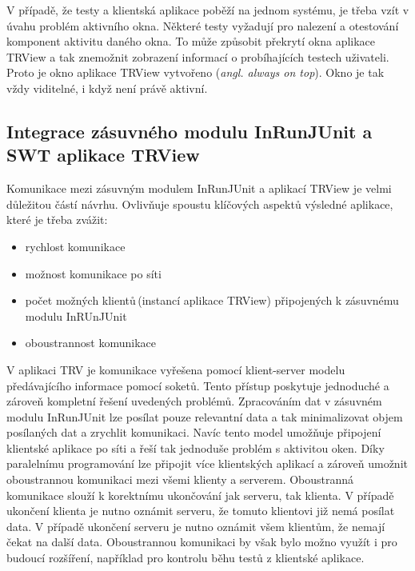     \noindent
    V případě, že testy a klientská aplikace poběží na jednom systému, je třeba vzít v úvahu problém aktivního okna. Některé testy vyžadují pro nalezení a otestování komponent aktivitu daného okna. To může způsobit překrytí okna aplikace TRView a tak znemožnit zobrazení informací o probíhajících testech uživateli. Proto je okno aplikace TRView vytvořeno (\emph{angl. always on top}). Okno je tak vždy viditelné, i když není právě aktivní.

    \subsection{Integrace zásuvného modulu InRunJUnit a SWT aplikace TRView}
    Komunikace mezi zásuvným modulem InRunJUnit a aplikací TRView je velmi důležitou částí návrhu. Ovlivňuje spoustu klíčových aspektů výsledné aplikace, které je třeba zvážit:
    \begin{itemize}
     \item rychlost komunikace
     \item možnost komunikace po síti
     \item počet možných klientů\,(instancí aplikace TRView) připojených k zásuvnému modulu InRUnJUnit
     \item oboustrannost komunikace
    \end{itemize}
    
    \noindent
    V aplikaci TRV je komunikace vyřešena pomocí klient-server modelu předávajícího informace pomocí soketů. Tento přístup poskytuje jednoduché a zároveň kompletní řešení uvedených problémů. Zpracováním dat v zásuvném modulu InRunJUnit lze posílat pouze relevantní data a tak minimalizovat objem posílaných dat a zrychlit komunikaci. Navíc tento model umožňuje připojení klientské aplikace po síti a řeší tak jednoduše problém s aktivitou oken. Díky paralelnímu programování lze připojit více klientských aplikací a zároveň umožnit oboustrannou komunikaci mezi všemi klienty a serverem. Oboustranná komunikace slouží k korektnímu ukončování jak serveru, tak klienta. V případě ukončení klienta je nutno oznámit serveru, že tomuto klientovi již nemá posílat data. V případě ukončení serveru je nutno oznámit všem klientům, že nemají čekat na další data. Oboustrannou komunikaci by však bylo možno využít i pro budoucí rozšíření, například pro kontrolu běhu testů z klientské aplikace.
    
